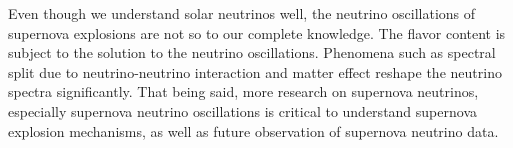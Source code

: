 Even though we understand solar neutrinos well, the neutrino oscillations of supernova explosions are not so to our complete knowledge. The flavor content is subject to the solution to the neutrino oscillations. Phenomena such as spectral split due to neutrino-neutrino interaction and matter effect reshape the neutrino spectra significantly. That being said, more research on supernova neutrinos, especially supernova neutrino oscillations is critical to understand supernova explosion mechanisms, as well as future observation of supernova neutrino data.
